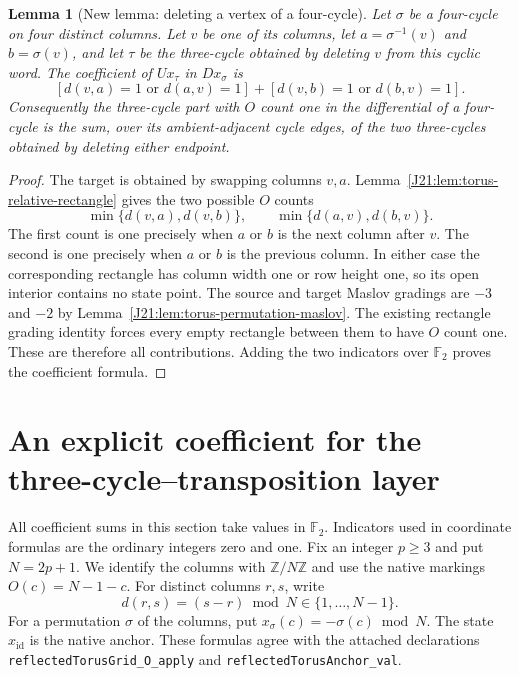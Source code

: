 \documentclass[11pt,oneside]{report}
\newtheorem{lemma}[theorem]{Lemma}
\theoremstyle{definition}
\numberwithin{equation}{section}
\newcommand{\decl}[1]{\textnormal{\nolinkurl{#1}}}
\begin{document}
\begin{lemma}[New lemma: deleting a vertex of a four-cycle]
\label{J21:lem:torus-fourcycle-deletion}
Let $\sigma$ be a four-cycle on four distinct columns. Let $v$ be one of
its columns, let $a=\sigma^{-1}(v)$ and $b=\sigma(v)$, and let $\tau$ be
the three-cycle obtained by deleting $v$ from this cyclic word.
The coefficient of $U x_\tau$ in $D x_\sigma$ is
\[
 [d(v,a)=1\text{ or }d(a,v)=1]
 +[d(v,b)=1\text{ or }d(b,v)=1].
\]
Consequently the three-cycle part with $O$ count one in the differential
of a four-cycle is the sum, over its ambient-adjacent cycle edges, of
the two three-cycles obtained by deleting either endpoint.
\end{lemma}
\begin{proof}
The target is obtained by swapping columns $v,a$.
Lemma~\ref{J21:lem:torus-relative-rectangle} gives the two possible $O$ counts
\[
 \min\{d(v,a),d(v,b)\},\qquad
 \min\{d(a,v),d(b,v)\}.
\]
The first count is one precisely when $a$ or $b$ is the next column after
$v$. The second is one precisely when $a$ or $b$ is the previous column.
In either case the corresponding rectangle has column width one or row
height one, so its open interior contains no state point.
The source and target Maslov gradings are $-3$ and $-2$ by
Lemma~\ref{J21:lem:torus-permutation-maslov}. The existing rectangle grading
identity forces every empty rectangle between them to have $O$ count
one. These are therefore all contributions. Adding the two indicators
over $\mathbb F_2$ proves the coefficient formula.
\end{proof}



\section{An explicit coefficient for the three-cycle--transposition layer}
\label{J21:sec:h32-definition}

All coefficient sums in this section take values in $\mathbb F _2$.
Indicators used in coordinate formulas are the ordinary integers zero and one. Fix an integer $p\geq3$ and put $N=2p+1$.
We identify the columns with $\mathbb Z/N\mathbb Z$ and use the native
markings $O(c)=N-1-c$. For distinct columns $r,s$, write
\[
 d(r,s)=(s-r)\bmod N\in\{1,\ldots,N-1\}.
\]
For a permutation $\sigma$ of the columns, put
$x_\sigma(c)=-\sigma(c)\bmod N$.
The state $x_{\mathrm{id}}$ is the native anchor.
These formulas agree with the attached declarations
\decl{reflectedTorusGrid_O_apply} and
\decl{reflectedTorusAnchor_val}.
\end{document}
